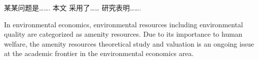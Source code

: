 \begin{cabstract}
    某某问题是…….
    本文 采用了……
    研究表明…….
\end{cabstract}

\begin{eabstract}
    In environmental economics, environmental resources including environmental quality are categorized as amenity resources. Due to its importance to human welfare, the amenity resources theoretical study and valuation is an ongoing issue at the academic frontier in the environmental economics area.
\end{eabstract}
